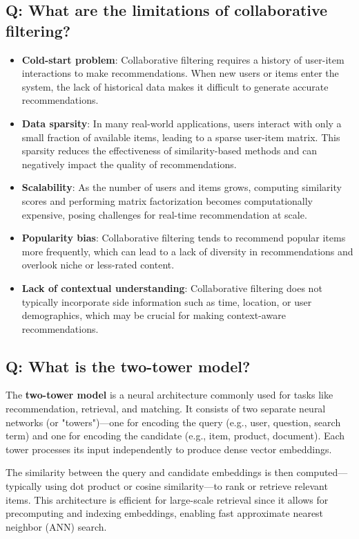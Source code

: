 \subsection*{Q: What are the limitations of collaborative filtering?}
\begin{itemize}
	\item \textbf{Cold-start problem}: Collaborative filtering requires a history of user-item interactions to make recommendations. When new users or items enter the system, the lack of historical data makes it difficult to generate accurate recommendations.
	\item \textbf{Data sparsity}: In many real-world applications, users interact with only a small fraction of available items, leading to a sparse user-item matrix. This sparsity reduces the effectiveness of similarity-based methods and can negatively impact the quality of recommendations.
	\item \textbf{Scalability}: As the number of users and items grows, computing similarity scores and performing matrix factorization becomes computationally expensive, posing challenges for real-time recommendation at scale.
	\item \textbf{Popularity bias}: Collaborative filtering tends to recommend popular items more frequently, which can lead to a lack of diversity in recommendations and overlook niche or less-rated content.
	\item \textbf{Lack of contextual understanding}: Collaborative filtering does not typically incorporate side information such as time, location, or user demographics, which may be crucial for making context-aware recommendations.
\end{itemize}

\subsection*{Q: What is the two-tower model?}
The \textbf{two-tower model} is a neural architecture commonly used for tasks like recommendation, retrieval, and matching. It consists of two separate neural networks (or "towers")—one for encoding the query (e.g., user, question, search term) and one for encoding the candidate (e.g., item, product, document). Each tower processes its input independently to produce dense vector embeddings.

The similarity between the query and candidate embeddings is then computed—typically using dot product or cosine similarity—to rank or retrieve relevant items. This architecture is efficient for large-scale retrieval since it allows for precomputing and indexing embeddings, enabling fast approximate nearest neighbor (ANN) search.

